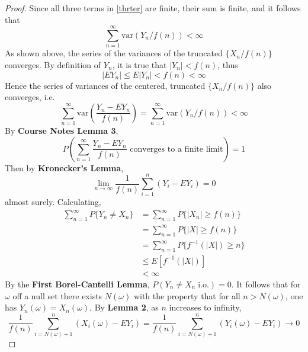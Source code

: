 \documentclass[letterpaper, 12pt]{article}
\newcommand{\io}{\;\text{i.o.}}
\newcommand{\var}{\text{var}}
\newcommand{\sion}{\sum_{i=1}^n}
\newcommand{\snoi}{\sum_{n=1}^\infty}
\begin{document}
\begin{proof}
Since all three terms in \eqref{thrter} are finite, their sum is finite, and it follows that
\[
\snoi \var(Y_n / f(n)) <\infty
\]
As shown above, the series of the variances of the truncated $\{X_n / f(n)\}$ converges. 
By definition of $Y_n$, it is true that $|Y_n| < f(n)$, thus
\begin{equation}
|EY_n| \leq E|Y_n| < f(n) < \infty
\label{eyfin}
\end{equation}
Hence the series of variances of the centered, truncated $\{X_n/f(n)\}$ also converges, i.e.
\[
\snoi \var\left(\frac{Y_n - EY_n}{f(n)}\right) 
=\snoi \var(Y_n / f(n)) 
<\infty
\]
By \textbf{Course Notes Lemma 3},
\[
P\left(\snoi \frac{Y_n - EY_n}{f(n)} \text{ converges to a finite limit}\right) = 1
\]
Then by \textbf{Kronecker's Lemma},
\[
\lim_{n \to \infty} \frac{1}{f(n)} \sion (Y_i - EY_i) = 0
\]
almost surely. Calculating,
\begin{align*}
\snoi P\{Y_n \neq X_n\} 
&=
\snoi  P\{|X_n| \geq f(n)\}
\\
&=
\snoi P\{|X| \geq f(n)\} 
\\
&=
\snoi P\{f^{-1}(|X|) \geq n\} 
\\
&\leq
E[f^{-1}(|X|)] 
\\
&< \infty
\end{align*}
By the \textbf{First Borel-Cantelli Lemma}, $P(Y_n \neq X_n \io) = 0$. 
It follows that for $\omega$ off a null set there exists $N(\omega)$ with the property that for all $n > N(\omega)$, one has $Y_n(\omega) = X_n(\omega)$.  By \textbf{Lemma 2}, as $n$ increases to infinity, 
\[
\frac{1}{f(n)} \sum_{i=N(\omega)+1}^n (X_i(\omega) - EY_i) = \frac{1}{f(n)} \sum_{i=N(\omega)+1}^n (Y_i(\omega) - EY_i) \to 0
\]
\end{proof}
\end{document}

